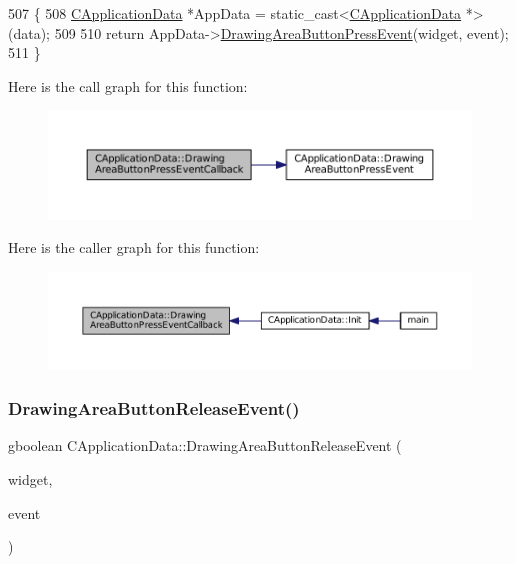 \begin{DoxyCode}
507                                                                                                            
                \{
508     \hyperlink{classCApplicationData}{CApplicationData} *AppData = \textcolor{keyword}{static\_cast<}\hyperlink{classCApplicationData}{CApplicationData} *\textcolor{keyword}{>}(data);
509 
510     \textcolor{keywordflow}{return} AppData->\hyperlink{classCApplicationData_ae7516e29f629998e4068ae1584d0237c}{DrawingAreaButtonPressEvent}(widget, event);
511 \}
\end{DoxyCode}
Here is the call graph for this function\+:\nopagebreak
\begin{figure}[H]
\begin{center}
\leavevmode
\includegraphics[width=350pt]{classCApplicationData_aaa867e992733fa1e88e67c026c8a2947_cgraph}
\end{center}
\end{figure}
Here is the caller graph for this function\+:\nopagebreak
\begin{figure}[H]
\begin{center}
\leavevmode
\includegraphics[width=350pt]{classCApplicationData_aaa867e992733fa1e88e67c026c8a2947_icgraph}
\end{center}
\end{figure}
\hypertarget{classCApplicationData_a7df4d71ef6fabf7eac740c95cfe3cd81}{}\label{classCApplicationData_a7df4d71ef6fabf7eac740c95cfe3cd81} 
\subsubsection{\texorpdfstring{Drawing\+Area\+Button\+Release\+Event()}{DrawingAreaButtonReleaseEvent()}}
{\footnotesize\ttfamily gboolean C\+Application\+Data\+::\+Drawing\+Area\+Button\+Release\+Event (\begin{DoxyParamCaption}\item[{Gtk\+Widget $\ast$}]{widget,  }\item[{Gdk\+Event\+Button $\ast$}]{event }\end{DoxyParamCaption})\hspace{0.3cm}{\ttfamily [protected]}}



